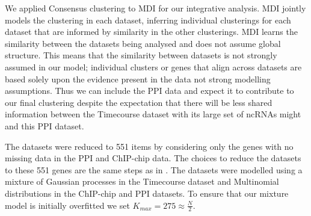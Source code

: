 \documentclass{bioinfo}
\begin{document}
We applied Consensus clustering to MDI for our integrative analysis. MDI jointly models the clustering in each dataset, inferring individual clusterings for each dataset that are informed by similarity in the other clusterings. MDI learns the similarity between the datasets being analysed and does not assume global structure. This means that the similarity between datasets is not strongly assumed in our model; individual clusters or genes that align across datasets are based solely upon the evidence present in the data not strong modelling assumptions. Thus we can include the PPI data and expect it to contribute to our final clustering despite the expectation that there will be less shared information between the Timecourse dataset with its large set of ncRNAs might and this PPI dataset.

The datasets were reduced to 551 items by considering only the genes with no missing data in the PPI and ChIP-chip data. The choices to reduce the datasets to these 551 genes are the same steps as in \cite{kirk2012bayesian}. 
The datasets were modelled using a mixture of Gaussian processes in the Timecourse dataset and Multinomial distributions in the ChIP-chip and PPI datasets. To ensure that our mixture model is initially overfitted we set $K_{max}=275\approx\frac{N}{2}$.



\end{document}

